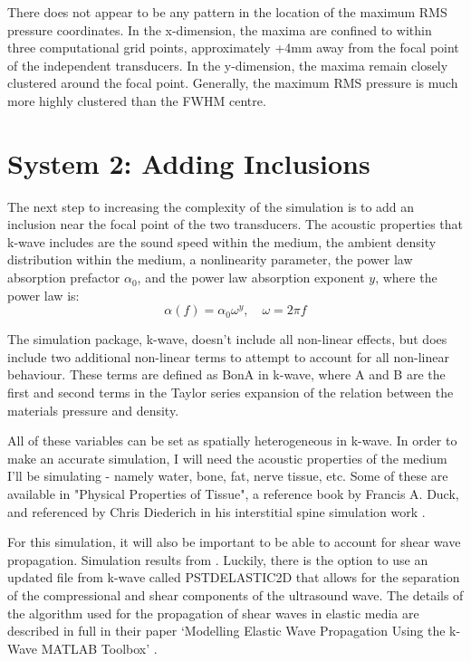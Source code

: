\documentclass[10pt,a4paper]{article}
\begin{document}
There does not appear to be any pattern in the location of the maximum RMS pressure coordinates. In the x-dimension, the maxima are confined to within three computational grid points, approximately +4mm away from the focal point of the independent transducers. In the y-dimension, the maxima remain closely clustered around the focal point. Generally, the maximum RMS pressure is much more highly clustered than the FWHM centre.

\section{System 2: Adding Inclusions}

The next step to increasing the complexity of the simulation is to add an inclusion near the focal point of the two transducers. The acoustic properties that k-wave includes are the sound speed within the medium, the ambient density distribution within the medium, a nonlinearity parameter, the power law absorption prefactor $\alpha_0$, and the power law absorption exponent $y$, where the power law is:
\begin{equation}
\alpha(f) = \alpha_0 \omega^y, 	\quad \omega = 2 \pi f 
\end{equation}

The simulation package, k-wave, doesn't include all non-linear effects, but does include two additional non-linear terms to attempt to account for all non-linear behaviour. These terms are defined as BonA in k-wave, where A and B are the first and second terms in the Taylor series expansion of the relation between the materials pressure and density.

All of these variables can be set as spatially heterogeneous in k-wave. In order to make an accurate simulation, I will need the acoustic properties of the medium I'll be simulating - namely water, bone, fat, nerve tissue, etc. Some of these are available in "Physical Properties of Tissue", a reference book by Francis A. Duck, and referenced by Chris Diederich in his interstitial spine simulation work \cite{duck1990physical}.

For this simulation, it will also be important to be able to account for shear wave propagation. Simulation results from \cite{treeby2015contribution}. Luckily, there is the option to use an updated file from k-wave called PSTDELASTIC2D that allows for the separation of the compressional and shear components of the ultrasound wave. The details of the algorithm used for the propagation of shear waves in elastic media are described in full in their paper `Modelling Elastic Wave Propagation Using the k-Wave MATLAB Toolbox' \cite{treeby2014modelling}. 
\end{document}
